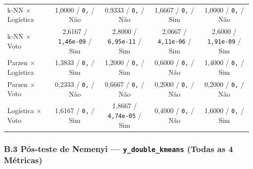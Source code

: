 \documentclass[a4paper,11pt]{article}
\begin{document}
\begin{center}
\begin{minipage}{\linewidth}
\begin{tabularx}{\linewidth}{P{2.6cm} C C C C}
k-NN $\times$ Logística & 1,0000 / \texttt{0,} / Não & 0,9333 / \texttt{0,} / Não & 1,6667 / \texttt{0,} / Sim & 1,0000 / \texttt{0,} / Não \\
k-NN $\times$ Voto & 2,6167 / \texttt{1,\allowbreak 46e-09} / Sim & 2,8000 / \texttt{6,\allowbreak 95e-11} / Sim & 2,0667 / \texttt{4,\allowbreak 11e-06} / Sim & 2,6000 / \texttt{1,\allowbreak 91e-09} / Sim \\
Parzen $\times$ Logística & 1,3833 / \texttt{0,} / Sim & 1,2000 / \texttt{0,} / Sim & 0,6000 / \texttt{0,} / Não & 1,4000 / \texttt{0,} / Sim \\
Parzen $\times$ Voto & 0,2333 / \texttt{0,} / Não & 0,6667 / \texttt{0,} / Não & 0,2000 / \texttt{0,} / Não & 0,2000 / \texttt{0,} / Não \\
Logística $\times$ Voto & 1,6167 / \texttt{0,} / Sim & 1,8667 / \texttt{4,\allowbreak 74e-05} / Sim & 0,4000 / \texttt{0,} / Não & 1,6000 / \texttt{0,} / Sim \\
\bottomrule
\end{tabularx}
\end{minipage}
\end{center}


\subsubsection*{\texorpdfstring{B.3 Pós-teste de Nemenyi --- \texttt{y\_double\_kmeans} (Todas as 4 Métricas)}{B.3 Pós-teste de Nemenyi - ydoublekmeans (Todas as 4 Métricas)}}\label{sec:b-3-pos-teste-de-nemenyi-ydoublekmeans-todas-as-4-metricas}
\end{document}
